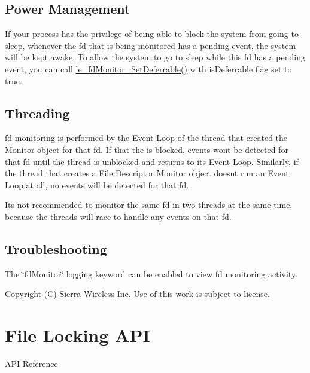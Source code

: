 \hypertarget{c_fd_monitor_c_fdMonitorPowerManagement}{}\subsection{Power Management}\label{c_fd_monitor_c_fdMonitorPowerManagement}
If your process has the privilege of being able to block the system from going to sleep, whenever the fd that is being monitored has a pending event, the system will be kept awake. To allow the system to go to sleep while this fd has a pending event, you can call \hyperlink{le__fd_monitor_8h_a66a93ae01f1e6faf1d0c7645752d4442}{le\+\_\+fd\+Monitor\+\_\+\+Set\+Deferrable()} with {\ttfamily is\+Deferrable} flag set to \textquotesingle{}true\textquotesingle{}.\hypertarget{c_fd_monitor_c_fdMonitorThreading}{}\subsection{Threading}\label{c_fd_monitor_c_fdMonitorThreading}
fd monitoring is performed by the Event Loop of the thread that created the Monitor object for that fd. If that the is blocked, events won\textquotesingle{}t be detected for that fd until the thread is unblocked and returns to its Event Loop. Similarly, if the thread that creates a File Descriptor Monitor object doesn\textquotesingle{}t run an Event Loop at all, no events will be detected for that fd.

It\textquotesingle{}s not recommended to monitor the same fd in two threads at the same time, because the threads will race to handle any events on that fd.\hypertarget{c_fd_monitor_c_fdMonitorTroubleshooting}{}\subsection{Troubleshooting}\label{c_fd_monitor_c_fdMonitorTroubleshooting}
The \char`\"{}fd\+Monitor\char`\"{} logging keyword can be enabled to view fd monitoring activity.





Copyright (C) Sierra Wireless Inc. Use of this work is subject to license. \hypertarget{c_flock}{}\section{File Locking A\+P\+I}\label{c_flock}
\hyperlink{le__file_lock_8h}{A\+P\+I Reference}





